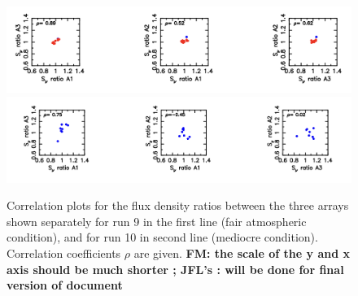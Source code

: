 \begin{figure}[p]
\begin{center}                                                                                                             
\includegraphics[clip, angle=0, scale=0.55]{Figures/Corr_r9.png}
  \includegraphics[clip, angle=0, scale=0.55]{Figures/Corr_r10.png}  
  \caption{Correlation plots for the flux density ratios between  the three arrays
    shown separately for run 9 in the first line (fair atmospheric condition),  and for run 10 in second line (mediocre condition).
    Correlation coefficients $\rho$ are given. {\bf FM: the scale of
      the y and x axis should be much shorter ; JFL's : will be done for final
    version of document}}
\label{fig:U_N_corr}
\end{center}                                                                                                             
\end{figure}


